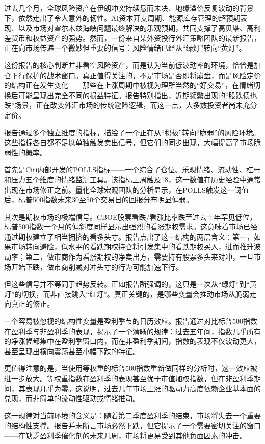 \documentclass[11pt]{ctexart}
\begin{document}
过去几个月，全球风险资产在伊朗冲突持续悬而未决、地缘溢价反复波动的背景下，依然走出了令人意外的韧性。AI资本开支周期、能源库存管理的超预期表现、以及市场对霍尔木兹海峡问题最终解决的乐观预期，共同支撑了高贝塔、高利差货币和权益资产的强势。然而，一份来自某外资投行外汇策略团队的最新报告，正在向市场传递一个微妙但重要的信号：风险情绪已经从“绿灯”转向“黄灯”。

这份报告的核心判断并非看空风险资产，而是认为当前低波动率的环境，恰恰是加仓下行保护的战术窗口。真正值得关注的，不是市场是否即将崩盘，而是风险定价的结构正在发生变化——那些在上涨周期中被视为理所当然的“好交易”，在情绪切换后可能呈现出完全不同的损益特征。报告特别指出，近期频繁出现的“股跌债也跌”场景，正在改变外汇市场的传统避险逻辑，而这一点，大多数投资者尚未充分定价。

报告通过多个独立维度的指标，描绘了一个正在从“积极”转向“脆弱”的风险环境。这些指标各自都不足以单独触发卖出信号，但它们的同步出现，大幅提高了市场脆弱性的概率。

首先是Citi内部开发的POLLS指标——一个综合了仓位、乐观情绪、流动性、杠杆和压力五个维度的情绪监测工具。该指标上周触及18，这一数值在历史经验中通常出现在市场修正之前。量化全球宏观团队的分析显示，在POLLS触发这一阈值后，标普500指数未来30至50个交易日的回报分布明显偏弱。

其次是期权市场的极端信号。CBOE股票看跌/看涨比率跌至过去十年罕见低位，标普500指数一个月的偏斜度同样显示出强烈的看涨期权需求。这意味着市场已经通过期权建立了相当拥挤的看多头寸。报告点出了这一结构的两层含义：第一，如果市场转向避险，低水平的看跌期权持仓将引发集中的看跌期权买入，进而推升波动率；第二，做市商作为看涨期权的净卖出方，需要持有股票多头来对冲，一旦市场开始下跌，做市商削减对冲头寸的行为可能加速下行。

但这些信号并不等同于趋势反转。正如报告所强调的，这只是一次从“绿灯”到“黄灯”的切换，而非直接跳入“红灯”。真正关键的，是哪些变量会推动市场从脆弱走向真正的修正。

一个容易被忽视的结构性变量是盈利季节的日历效应。报告通过对比标普500指数在盈利季与非盈利季的表现，揭示了一个清晰的规律：过去五年间，指数几乎所有的净涨幅都集中在盈利季窗口内，而在非盈利季期间，指数的表现不仅波动更大，甚至呈现出横向震荡甚至小幅下跌的特征。

更值得注意的是，当使用等权重的标普500指数重新做同样的分析时，这一效应被进一步放大。等权重指数在盈利季的表现甚至优于市值加权指数，但在非盈利季期间，其表现几乎为零。这说明，过去几年市场上涨的驱动力高度依赖企业基本面的兑现，而非简单的流动性驱动或情绪推动。

这一规律对当前环境的含义是：随着第二季度盈利季的结束，市场将失去一个重要的结构性支撑。报告并未断言市场必然下跌，但它提示了一个需要密切关注的窗口——在缺乏盈利季催化剂的未来几周，市场将更易受到其他负面因素的冲击。
\end{document}

